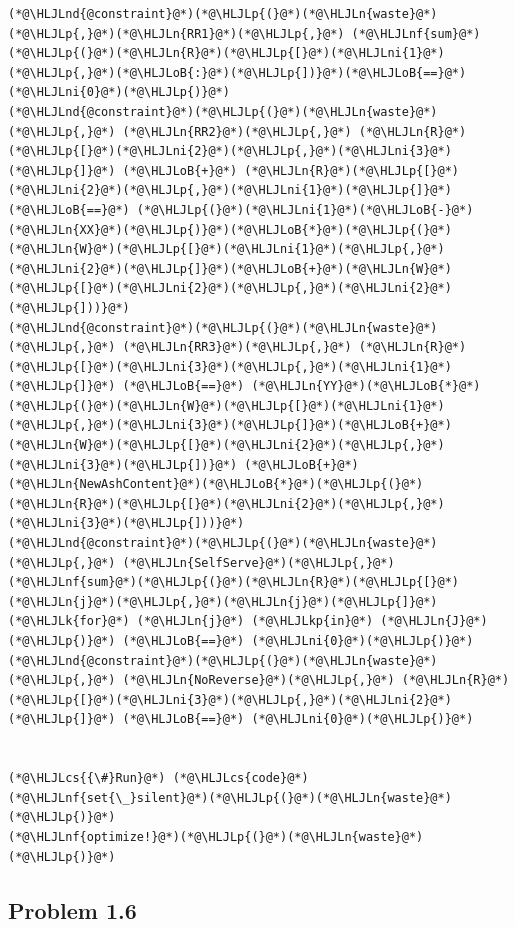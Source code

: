\documentclass[12pt,a4paper]{article}
\newcommand{\HLJLk}[1]{\textcolor[RGB]{148,91,176}{\textbf{#1}}}
\newcommand{\HLJLkp}[1]{\textcolor[RGB]{148,91,176}{\textbf{#1}}}
\newcommand{\HLJLn}[1]{#1}
\newcommand{\HLJLnd}[1]{\textcolor[RGB]{214,102,97}{#1}}
\newcommand{\HLJLnf}[1]{\textcolor[RGB]{66,102,213}{#1}}
\newcommand{\HLJLni}[1]{\textcolor[RGB]{59,151,46}{#1}}
\newcommand{\HLJLoB}[1]{\textcolor[RGB]{102,102,102}{\textbf{#1}}}
\newcommand{\HLJLp}[1]{#1}
\newcommand{\HLJLcs}[1]{\textcolor[RGB]{153,153,119}{\textit{#1}}}
\begin{document}
\begin{lstlisting}
(*@\HLJLnd{@constraint}@*)(*@\HLJLp{(}@*)(*@\HLJLn{waste}@*)(*@\HLJLp{,}@*)(*@\HLJLn{RR1}@*)(*@\HLJLp{,}@*) (*@\HLJLnf{sum}@*)(*@\HLJLp{(}@*)(*@\HLJLn{R}@*)(*@\HLJLp{[}@*)(*@\HLJLni{1}@*)(*@\HLJLp{,}@*)(*@\HLJLoB{:}@*)(*@\HLJLp{])}@*)(*@\HLJLoB{==}@*) (*@\HLJLni{0}@*)(*@\HLJLp{)}@*)
(*@\HLJLnd{@constraint}@*)(*@\HLJLp{(}@*)(*@\HLJLn{waste}@*)(*@\HLJLp{,}@*) (*@\HLJLn{RR2}@*)(*@\HLJLp{,}@*) (*@\HLJLn{R}@*)(*@\HLJLp{[}@*)(*@\HLJLni{2}@*)(*@\HLJLp{,}@*)(*@\HLJLni{3}@*)(*@\HLJLp{]}@*) (*@\HLJLoB{+}@*) (*@\HLJLn{R}@*)(*@\HLJLp{[}@*)(*@\HLJLni{2}@*)(*@\HLJLp{,}@*)(*@\HLJLni{1}@*)(*@\HLJLp{]}@*) (*@\HLJLoB{==}@*) (*@\HLJLp{(}@*)(*@\HLJLni{1}@*)(*@\HLJLoB{-}@*)(*@\HLJLn{XX}@*)(*@\HLJLp{)}@*)(*@\HLJLoB{*}@*)(*@\HLJLp{(}@*)(*@\HLJLn{W}@*)(*@\HLJLp{[}@*)(*@\HLJLni{1}@*)(*@\HLJLp{,}@*)(*@\HLJLni{2}@*)(*@\HLJLp{]}@*)(*@\HLJLoB{+}@*)(*@\HLJLn{W}@*)(*@\HLJLp{[}@*)(*@\HLJLni{2}@*)(*@\HLJLp{,}@*)(*@\HLJLni{2}@*)(*@\HLJLp{]))}@*)
(*@\HLJLnd{@constraint}@*)(*@\HLJLp{(}@*)(*@\HLJLn{waste}@*)(*@\HLJLp{,}@*) (*@\HLJLn{RR3}@*)(*@\HLJLp{,}@*) (*@\HLJLn{R}@*)(*@\HLJLp{[}@*)(*@\HLJLni{3}@*)(*@\HLJLp{,}@*)(*@\HLJLni{1}@*)(*@\HLJLp{]}@*) (*@\HLJLoB{==}@*) (*@\HLJLn{YY}@*)(*@\HLJLoB{*}@*)(*@\HLJLp{(}@*)(*@\HLJLn{W}@*)(*@\HLJLp{[}@*)(*@\HLJLni{1}@*)(*@\HLJLp{,}@*)(*@\HLJLni{3}@*)(*@\HLJLp{]}@*)(*@\HLJLoB{+}@*)(*@\HLJLn{W}@*)(*@\HLJLp{[}@*)(*@\HLJLni{2}@*)(*@\HLJLp{,}@*)(*@\HLJLni{3}@*)(*@\HLJLp{])}@*) (*@\HLJLoB{+}@*) (*@\HLJLn{NewAshContent}@*)(*@\HLJLoB{*}@*)(*@\HLJLp{(}@*)(*@\HLJLn{R}@*)(*@\HLJLp{[}@*)(*@\HLJLni{2}@*)(*@\HLJLp{,}@*)(*@\HLJLni{3}@*)(*@\HLJLp{]))}@*)
(*@\HLJLnd{@constraint}@*)(*@\HLJLp{(}@*)(*@\HLJLn{waste}@*)(*@\HLJLp{,}@*) (*@\HLJLn{SelfServe}@*)(*@\HLJLp{,}@*) (*@\HLJLnf{sum}@*)(*@\HLJLp{(}@*)(*@\HLJLn{R}@*)(*@\HLJLp{[}@*)(*@\HLJLn{j}@*)(*@\HLJLp{,}@*)(*@\HLJLn{j}@*)(*@\HLJLp{]}@*) (*@\HLJLk{for}@*) (*@\HLJLn{j}@*) (*@\HLJLkp{in}@*) (*@\HLJLn{J}@*)(*@\HLJLp{)}@*) (*@\HLJLoB{==}@*) (*@\HLJLni{0}@*)(*@\HLJLp{)}@*)
(*@\HLJLnd{@constraint}@*)(*@\HLJLp{(}@*)(*@\HLJLn{waste}@*)(*@\HLJLp{,}@*) (*@\HLJLn{NoReverse}@*)(*@\HLJLp{,}@*) (*@\HLJLn{R}@*)(*@\HLJLp{[}@*)(*@\HLJLni{3}@*)(*@\HLJLp{,}@*)(*@\HLJLni{2}@*)(*@\HLJLp{]}@*) (*@\HLJLoB{==}@*) (*@\HLJLni{0}@*)(*@\HLJLp{)}@*)


(*@\HLJLcs{{\#}Run}@*) (*@\HLJLcs{code}@*)
(*@\HLJLnf{set{\_}silent}@*)(*@\HLJLp{(}@*)(*@\HLJLn{waste}@*)(*@\HLJLp{)}@*)
(*@\HLJLnf{optimize!}@*)(*@\HLJLp{(}@*)(*@\HLJLn{waste}@*)(*@\HLJLp{)}@*)
\end{lstlisting}


\subsection{Problem 1.6}
\end{document}
